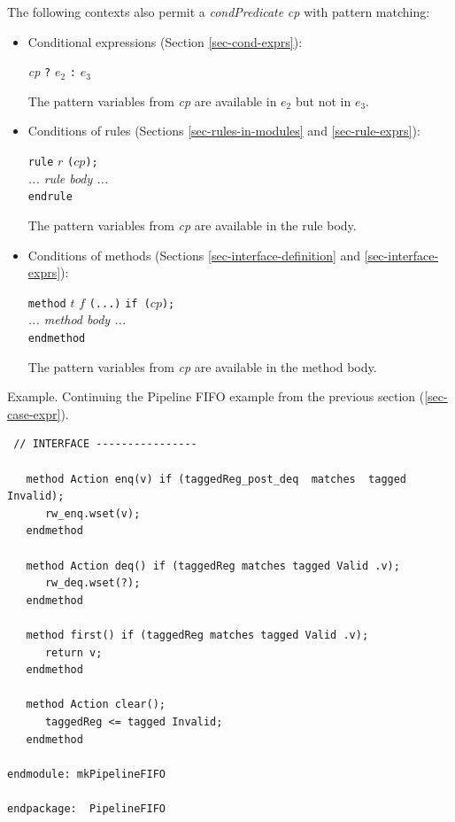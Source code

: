 \documentclass[twoside,letterpaper]{article}
\newcommand{\hmm}{\hspace*{2em}}
\newcommand{\hmmm}{\hspace*{3em}}
\newcommand{\nterm}[1]{\emph{#1}}
\newcommand{\term}[1]{\texttt{#1}}
\begin{document}
The following contexts also permit a \nterm{condPredicate} \emph{cp}
with pattern matching:
\begin{itemize}
\item
Conditional expressions (Section \ref{sec-cond-exprs}):

\hmm \emph{cp} \term{?} $e_2$ \term{:} $e_3$

The pattern variables from \emph{cp} are available in $e_2$ but not in
$e_3$.

\item
Conditions of rules (Sections \ref{sec-rules-in-modules} and \ref{sec-rule-exprs}):

\hmm \term{rule} $r$ \texttt{($cp$);} \\
\hmmm \emph{... rule body ...} \\
\hmm \term{endrule}

The pattern variables from \emph{cp} are available in the rule body.

\item
Conditions of methods (Sections \ref{sec-interface-definition} and
\ref{sec-interface-exprs}):

\hmm \term{method} $t$ $f$ \texttt{(...)} \texttt{if ($cp$);} \\
\hmmm \emph{... method body ...} \\
\hmm \term{endmethod}

The pattern variables from \emph{cp} are available in the method body.

\end{itemize}

Example.  Continuing the Pipeline FIFO example from the previous
section (\ref{sec-case-expr}).
\begin{verbatim}
 // INTERFACE ----------------
   
   method Action enq(v) if (taggedReg_post_deq  matches  tagged Invalid);
      rw_enq.wset(v);
   endmethod

   method Action deq() if (taggedReg matches tagged Valid .v);
      rw_deq.wset(?);
   endmethod

   method first() if (taggedReg matches tagged Valid .v);
      return v;
   endmethod

   method Action clear();
      taggedReg <= tagged Invalid;
   endmethod

endmodule: mkPipelineFIFO

endpackage:  PipelineFIFO
\end{verbatim}
\end{document}
